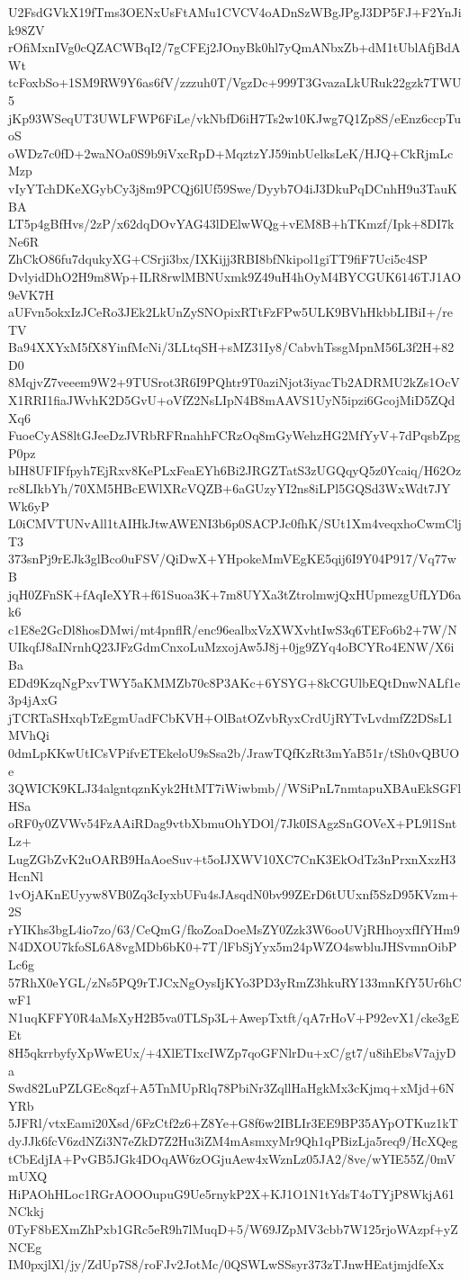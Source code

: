 U2FsdGVkX19fTms3OENxUsFtAMu1CVCV4oADnSzWBgJPgJ3DP5FJ+F2YnJik98ZV
rOfiMxnIVg0cQZACWBqI2/7gCFEj2JOnyBk0hl7yQmANbxZb+dM1tUblAfjBdAWt
tcFoxbSo+1SM9RW9Y6as6fV/zzzuh0T/VgzDc+999T3GvazaLkURuk22gzk7TWU5
jKp93WSeqUT3UWLFWP6FiLe/vkNbfD6iH7Ts2w10KJwg7Q1Zp8S/eEnz6ccpTuoS
oWDz7c0fD+2waNOa0S9b9iVxcRpD+MqztzYJ59inbUelksLeK/HJQ+CkRjmLcMzp
vIyYTchDKeXGybCy3j8m9PCQj6lUf59Swe/Dyyb7O4iJ3DkuPqDCnhH9u3TauKBA
LT5p4gBfHvs/2zP/x62dqDOvYAG43lDElwWQg+vEM8B+hTKmzf/Ipk+8DI7kNe6R
ZhCkO86fu7dqukyXG+CSrji3bx/IXKijj3RBI8bfNkipol1giTT9fiF7Uci5c4SP
DvlyidDhO2H9m8Wp+ILR8rwlMBNUxmk9Z49uH4hOyM4BYCGUK6146TJ1AO9eVK7H
aUFvn5okxIzJCeRo3JEk2LkUnZySNOpixRTtFzFPw5ULK9BVhHkbbLIBiI+/reTV
Ba94XXYxM5fX8YinfMcNi/3LLtqSH+sMZ31Iy8/CabvhTssgMpnM56L3f2H+82D0
8MqjvZ7veeem9W2+9TUSrot3R6I9PQhtr9T0aziNjot3iyacTb2ADRMU2kZs1OcV
X1RRI1fiaJWvhK2D5GvU+oVfZ2NsLIpN4B8mAAVS1UyN5ipzi6GcojMiD5ZQdXq6
FuoeCyAS8ltGJeeDzJVRbRFRnahhFCRzOq8mGyWehzHG2MfYyV+7dPqsbZpgP0pz
bIH8UFIFfpyh7EjRxv8KePLxFeaEYh6Bi2JRGZTatS3zUGQqyQ5z0Ycaiq/H62Oz
rc8LIkbYh/70XM5HBcEWlXRcVQZB+6aGUzyYI2ns8iLPl5GQSd3WxWdt7JYWk6yP
L0iCMVTUNvAll1tAIHkJtwAWENI3b6p0SACPJc0fhK/SUt1Xm4veqxhoCwmCljT3
373snPj9rEJk3glBco0uFSV/QiDwX+YHpokeMmVEgKE5qij6I9Y04P917/Vq77wB
jqH0ZFnSK+fAqIeXYR+f61Suoa3K+7m8UYXa3tZtrolmwjQxHUpmezgUfLYD6ak6
c1E8e2GcDl8hosDMwi/mt4pnflR/enc96ealbxVzXWXvhtIwS3q6TEFo6b2+7W/N
UIkqfJ8aINrnhQ23JFzGdmCnxoLuMzxojAw5J8j+0jg9ZYq4oBCYRo4ENW/X6iBa
EDd9KzqNgPxvTWY5aKMMZb70c8P3AKc+6YSYG+8kCGUlbEQtDnwNALf1e3p4jAxG
jTCRTaSHxqbTzEgmUadFCbKVH+OlBatOZvbRyxCrdUjRYTvLvdmfZ2DSsL1MVhQi
0dmLpKKwUtICsVPifvETEkeloU9sSsa2b/JrawTQfKzRt3mYaB51r/tSh0vQBUOe
3QWICK9KLJ34algntqznKyk2HtMT7iWiwbmb//WSiPnL7nmtapuXBAuEkSGFlHSa
oRF0y0ZVWv54FzAAiRDag9vtbXbmuOhYDOl/7Jk0ISAgzSnGOVeX+PL9l1SntLz+
LugZGbZvK2uOARB9HaAoeSuv+t5oIJXWV10XC7CnK3EkOdTz3nPrxnXxzH3HcnNl
1vOjAKnEUyyw8VB0Zq3cIyxbUFu4sJAsqdN0bv99ZErD6tUUxnf5SzD95KVzm+2S
rYIKhs3bgL4io7zo/63/CeQmG/fkoZoaDoeMsZY0Zzk3W6ooUVjRHhoyxfIfYHm9
N4DXOU7kfoSL6A8vgMDb6bK0+7T/lFbSjYyx5m24pWZO4swbluJHSvmnOibPLc6g
57RhX0eYGL/zNs5PQ9rTJCxNgOysIjKYo3PD3yRmZ3hkuRY133mnKfY5Ur6hCwF1
N1uqKFFY0R4aMsXyH2B5va0TLSp3L+AwepTxtft/qA7rHoV+P92evX1/cke3gEEt
8H5qkrrbyfyXpWwEUx/+4XlETIxcIWZp7qoGFNlrDu+xC/gt7/u8ihEbsV7ajyDa
Swd82LuPZLGEc8qzf+A5TnMUpRlq78PbiNr3ZqllHaHgkMx3cKjmq+xMjd+6NYRb
5JFRl/vtxEami20Xsd/6FzCtf2z6+Z8Ye+G8f6w2IBLIr3EE9BP35AYpOTKuz1kT
dyJJk6fcV6zdNZi3N7eZkD7Z2Hu3iZM4mAsmxyMr9Qh1qPBizLja5req9/HcXQeg
tCbEdjIA+PvGB5JGk4DOqAW6zOGjuAew4xWznLz05JA2/8ve/wYIE55Z/0mVmUXQ
HiPAOhHLoc1RGrAOOOupuG9Ue5rnykP2X+KJ1O1N1tYdsT4oTYjP8WkjA61NCkkj
0TyF8bEXmZhPxb1GRc5eR9h7lMuqD+5/W69JZpMV3cbb7W125rjoWAzpf+yZNCEg
IM0pxjlXl/jy/ZdUp7S8/roFJv2JotMc/0QSWLwSSsyr373zTJnwHEatjmjdfeXx

